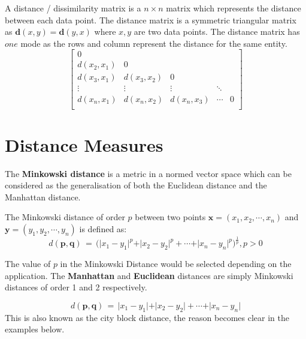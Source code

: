 \documentclass[11pt,fleqn]{book} %
\begin{document}
\begin{multicols}{2}
\noindent
A distance / dissimilarity matrix is a $n \times n$ matrix which represents the distance between each data point. The distance matrix is a symmetric triangular matrix as $\mathbf{d}(x, y) = \mathbf{d}(y, x)$ where $x, y$ are two data points. The distance matrix has $one$ mode as the rows and column represent the distance for the same entity.
\columnbreak
\begin{equation*}
	\begin{bmatrix}
		0 & & & & \\
		d(x_2, x_1) & 0 & & & \\
		d(x_3, x_1) & d(x_3, x_2) & 0 & & \\
		\vdots & \vdots & \vdots & \ddots & \\
		d(x_n, x_1) & d(x_n, x_2) & d(x_n, x_3) & \cdots & 0\\
	\end{bmatrix}
\end{equation*}
\end{multicols}

\section{Distance Measures}
The \textbf{Minkowski distance} is a metric in a normed vector space which can be considered as the generalisation of both the Euclidean distance and the Manhattan distance. \\

\begin{definition}
The Minkowski distance of order $p$ between two points $\mathbf{x} = (x_1, x_2, \cdots, x_n)$ and $\mathbf{y} = (y_1, y_2, \cdots, y_n)$ is defined as:
\begin{equation*}
	d(\mathbf{p},\mathbf{q}) \, = \, \Bigg(\vert x_1 - y_1 \vert^p + \vert x_2 - y_2 \vert^p + \cdots + \vert x_n - y_n \vert^p \Bigg)^{\frac{1}{p}}, p > 0
\end{equation*}
\end{definition}

\noindent
The value of $p$ in the Minkowski Distance would be selected depending on the application. The \textbf{Manhattan} and \textbf{Euclidean} distances are simply Minkowski distances of order 1 and 2 respectively.\\

\begin{definition}
\begin{equation*}
	d(\mathbf{p},\mathbf{q}) \, = \, \vert x_1 - y_1 \vert + \vert x_2 - y_2 \vert + \cdots + \vert x_n - y_n \vert
\end{equation*}
This is also known as the city block distance, the reason becomes clear in the examples below.
\end{definition}
\end{document}
